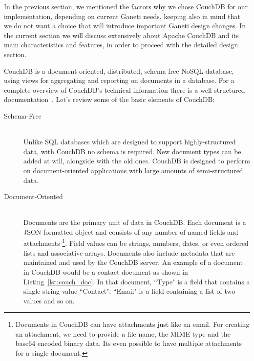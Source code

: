 In the previous section, we mentioned the factors why we chose CouchDB for our
implementation, depending on current Ganeti needs, keeping also in mind that we
do not want a choice that will introduce important Ganeti design changes. In the
current section we will discuss extensively about Apache CouchDB and its main
characteristics and features, in order to proceed with the detailed design
section.

CouchDB is a document-oriented, distributed, schema-free NoSQL database, using
views for aggregating and reporting on documents in a database. For a complete
overview of CouchDB's technical information there is a well structured
documentation~. Let's
review some of the basic elements of CouchDB:

\begin{description}
  \item[Schema-Free] \hfill \\
    Unlike SQL databases which are designed to support highly-structured data,
    with CouchDB no schema is required. New document types can be added at
    will, alongside with the old ones. CouchDB is designed to perform on
    document-oriented applications with large amounts of semi-structured data.
  \item[Document-Oriented] \hfill \\
    Documents are the primary unit of data in CouchDB. Each document is a JSON
    formatted object and consists of any number of named fields and attachments
    \footnote{Documents in CouchDB can have attachments just like an email. For
    creating an attachment, we need to provide a file name, the MIME type and
    the base64 encoded binary data. Its even possible to have multiple
    attachments for a single document.}.
    Field values can be strings, numbers, dates, or even ordered lists and
    associative arrays. Documents also include metadata that are maintained and
    used by the CouchDB server. An example of a document in CouchDB would be a
    contact document as shown in Listing~\ref{lst:couch_doc}. In that document,
    ``Type" is a field that contains a single string value ``Contact", ``Email"
    is a field containing a list of two values and so on.


\end{description}

